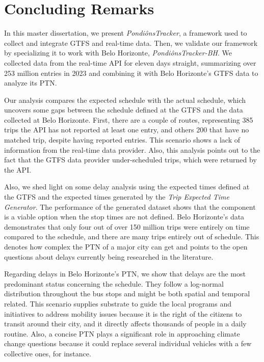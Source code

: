 \chapter{Concluding Remarks}
\label{cap5}

\vspace{-1.9cm}

In this master dissertation, we present \textit{PondiônsTracker}, a framework used to collect and
integrate GTFS and real-time data. Then, we validate our framework by specializing it to work with Belo Horizonte, \textit{PondiônsTracker-BH}. We collected data from the real-time API for eleven days straight, summarizing over 253 million entries in 2023 and combining it with Belo Horizonte's GTFS data to analyze 
its PTN. 

Our analysis compares the expected schedule with the actual schedule, which uncovers some gaps between
the schedule defined at the GTFS and the data collected at Belo Horizonte. First, there are a couple of routes, representing 385 trips the API has not reported at least one entry, and others 200 that have no matched trip, despite having reported entries. 
This scenario shows a lack of information from the real-time data provider. Also, this analysis points out
to the fact that the GTFS data provider under-scheduled trips, which were returned by the API.

Also, we shed light on some delay analysis using the expected times defined at the GTFS and the expected times
generated by the \textit{Trip Expected Time Generator}. The performance of the generated dataset shows that the
component is a viable option when the stop times are not defined. Belo Horizonte's data 
demonstrates that only four out of over 150 million trips were entirely on time compared to the schedule, and there are
many trips entirely out of schedule. This denotes how complex the PTN of a major city can get and points to the open
questions about delays currently being researched in the literature. 

Regarding delays in Belo Horizonte's PTN, we show that delays are the most predominant status concerning the schedule. 
They follow a {log-normal} distribution throughout the bus stops and might be both spatial and temporal related.
This scenario supplies substrate to guide the local programs and initiatives to address mobility issues because it
is the right of the citizens to transit around their city, and it directly affects thousands of people in a daily routine. 
Also, a concise PTN plays a significant role in approaching climate change questions because it could replace 
several individual vehicles with a few collective ones, for instance.

